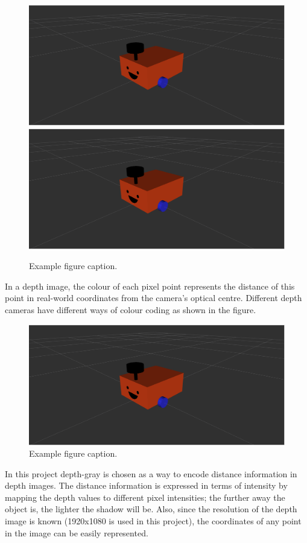 \begin{figure}[H]
    \centering
    \includegraphics[width=0.8\linewidth]{figs/robot.png}
    \includegraphics[width=0.8\linewidth]{figs/robot.png}
    \caption{Example figure caption.}
\end{figure}
In a depth image, the colour of each pixel point represents the distance of this point in real-world coordinates from the camera's optical centre. Different depth cameras have different ways of colour coding as shown in the figure.
\begin{figure}[H]
    \centering
    \includegraphics[width=0.8\linewidth]{figs/robot.png}
    \caption{Example figure caption.}
\end{figure}
In this project depth-gray is chosen as a way to encode distance information in depth images. The distance information is expressed in terms of intensity by mapping the depth values to different pixel intensities; the further away the object is, the lighter the shadow will be. Also, since the resolution of the depth image is known (1920x1080 is used in this project), the coordinates of any point in the image can be easily represented.
